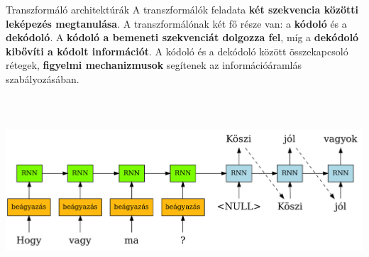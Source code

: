 \documentclass[english, aspectratio=169]{beamer}
\begin{document}
\begin{frame}{Transzformáló architektúrák}
A transzformálók feladata \textbf{két szekvencia közötti leképezés megtanulása}. A transzformálónak két fő része van: a \textbf{kódoló} és a \textbf{dekódoló}. A \textbf{kódoló a bemeneti szekvenciát dolgozza fel}, míg a \textbf{dekódoló kibővíti a kódolt információt}. A kódoló és a dekódoló között összekapcsoló rétegek, \textbf{figyelmi mechanizmusok} segítenek az információáramlás szabályozásában.
\begin{center}
\includegraphics[width=14cm, height=7cm, keepaspectratio]{graphs/transformer_1.png}
\end{center}

\end{frame}
\end{document}
